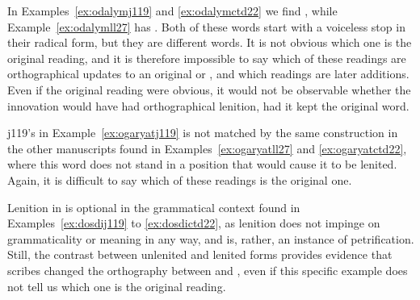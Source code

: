 In Examples~\ref{ex:odalymj119} and \ref{ex:odalymctd22} we find , while Example~\ref{ex:odalymll27} has . Both of these words start with a voiceless stop in their radical form, but they are different words. It is not obvious which one is the original reading, and it is therefore impossible to say which of these readings are orthographical updates to an original  or , and which readings are later additions. Even if the original reading were obvious, it would not be observable whether the innovation would have had orthographical lenition, had it kept the original word.

\begin{mwl}
\end{mwl}
\Gls{j119}'s  in Example~\ref{ex:ogaryatj119} is not matched by the same construction in the other manuscripts found in Examples~\ref{ex:ogaryatll27} and \ref{ex:ogaryatctd22}, where this word does not stand in a position that would cause it to be lenited. Again, it is difficult to say which of these readings is the original one.

\begin{mwl}
\end{mwl}

Lenition in  is optional in the grammatical context found in Examples~\ref{ex:dosdij119} to \ref{ex:dosdictd22}, as lenition does not impinge on grammaticality or meaning in any way, and is, rather, an instance of petrification. Still, the contrast between unlenited and lenited forms provides evidence that scribes changed the orthography between  and , even if this specific example does not tell us which one is the original reading.

